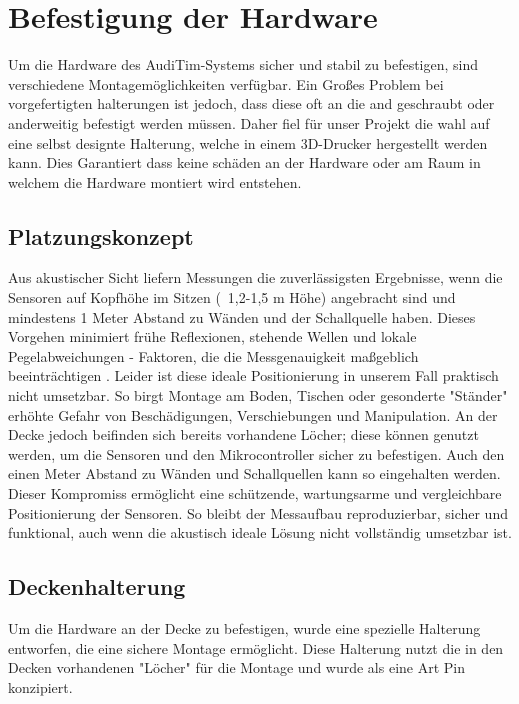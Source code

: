 \chapter{Befestigung der Hardware}
\label{chap:hardware-mounting}
Um die Hardware des AudiTim-Systems sicher und stabil zu befestigen, sind verschiedene Montagemöglichkeiten verfügbar. 
Ein Großes Problem bei vorgefertigten halterungen ist jedoch, dass diese oft an die and geschraubt oder anderweitig befestigt werden müssen.
Daher fiel für unser Projekt die wahl auf eine selbst designte Halterung, welche in einem 3D-Drucker hergestellt werden kann.
Dies Garantiert dass keine schäden an der Hardware oder am Raum in welchem die Hardware montiert wird entstehen.

\section{Platzungskonzept}
Aus akustischer Sicht liefern Messungen die zuverlässigsten Ergebnisse, wenn die Sensoren auf Kopfhöhe im Sitzen (~1,2-1,5 m Höhe) angebracht sind und mindestens 1 Meter Abstand zu Wänden und der Schallquelle haben. 
Dieses Vorgehen minimiert frühe Reflexionen, stehende Wellen und lokale Pegelabweichungen - Faktoren, die die Messgenauigkeit maßgeblich beeinträchtigen \cite{oltheten2019micplacement} .
Leider ist diese ideale Positionierung in unserem Fall praktisch nicht umsetzbar. So birgt Montage am Boden, Tischen oder gesonderte "Ständer" erhöhte Gefahr von Beschädigungen, Verschiebungen und Manipulation.
An der Decke jedoch beifinden sich bereits vorhandene Löcher; diese können genutzt werden, um die Sensoren und den Mikrocontroller sicher zu befestigen. 
Auch den einen Meter Abstand zu Wänden und Schallquellen kann so eingehalten werden.
Dieser Kompromiss ermöglicht eine schützende, wartungsarme und vergleichbare Positionierung der Sensoren.
So bleibt der Messaufbau reproduzierbar, sicher und funktional, auch wenn die akustisch ideale Lösung nicht vollständig umsetzbar ist.

\section{Deckenhalterung}
Um die Hardware an der Decke zu befestigen, wurde eine spezielle Halterung entworfen, die eine sichere Montage ermöglicht.
Diese Halterung nutzt die in den Decken vorhandenen "Löcher" für die Montage und wurde als eine Art Pin konzipiert.


